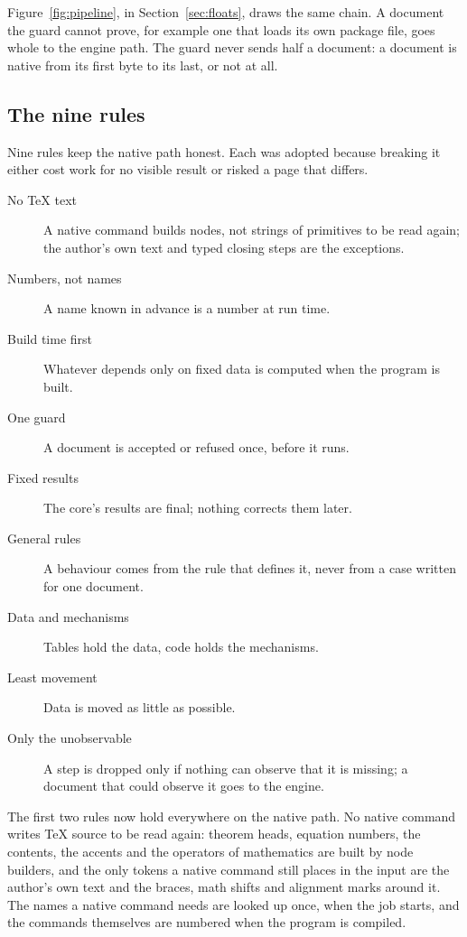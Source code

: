 \documentclass{article}
\numberwithin{equation}{section}
\theoremstyle{definition}
\theoremstyle{remark}
\begin{document}
Figure~\ref{fig:pipeline}, in Section~\ref{sec:floats}, draws the same chain. A
document the guard cannot prove, for example one that loads its own package file, goes
whole to the engine path. The guard never sends half a document: a document is native
from its first byte to its last, or not at all.

\subsection{The nine rules}

Nine rules keep the native path honest. Each was adopted because breaking it either
cost work for no visible result or risked a page that differs.

\begin{description}
  \item[No \TeX{} text] A native command builds nodes, not strings of primitives to be
        read again; the author's own text and typed closing steps are the exceptions.
  \item[Numbers, not names] A name known in advance is a number at run time.
  \item[Build time first] Whatever depends only on fixed data is computed when the
        program is built.
  \item[One guard] A document is accepted or refused once, before it runs.
  \item[Fixed results] The core's results are final; nothing corrects them later.
  \item[General rules] A behaviour comes from the rule that defines it, never from a
        case written for one document.
  \item[Data and mechanisms] Tables hold the data, code holds the mechanisms.
  \item[Least movement] Data is moved as little as possible.
  \item[Only the unobservable] A step is dropped only if nothing can observe that it
        is missing; a document that could observe it goes to the engine.
\end{description}

The first two rules now hold everywhere on the native path. No native command writes
\TeX{} source to be read again: theorem heads, equation numbers, the contents, the
accents and the operators of mathematics are built by node builders, and the only
tokens a native command still places in the input are the author's own text and the
braces, math shifts and alignment marks around it. The names a native command needs
are looked up once, when the job starts, and the commands themselves are numbered when
the program is compiled.
\end{document}
